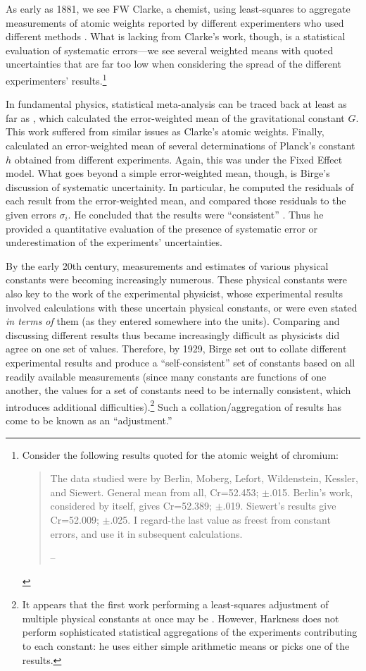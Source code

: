 \documentclass[letterpaper,12pt]{article}
\begin{document}
As early as 1881, we see FW Clarke, a chemist, using least-squares to aggregate measurements of atomic weights reported by different experimenters who used different methods \citep{clarke1881abstract}. What is lacking from Clarke's work, though, is a statistical evaluation of systematic errors---we see several weighted means with quoted uncertainties that are far too low when considering the spread of the different experimenters' results.\footnote{Consider the following results quoted for the atomic weight of chromium:
  \begin{quote}
    The data studied were by Berlin, Moberg, Lefort, Wildenstein, Kessler, and Siewert. General mean from all, Cr=52.453; $\pm$.015. Berlin's work, considered by itself, gives Cr=52.389; $\pm$.019. Siewert's results give Cr=52.009; $\pm$.025. I regard-the last value as freest from constant errors, and use it in subsequent calculations.
  
    \hfill-- \cite{clarke1881abstract}
  \end{quote}
}

In fundamental physics, statistical meta-analysis can be traced back at least as far as \cite{burgess1902value}, which calculated the error-weighted mean of the gravitational constant $G$. This work suffered from similar issues as Clarke's atomic weights. Finally, \cite{birge1919most} calculated an error-weighted mean of several determinations of Planck's constant $h$ obtained from different experiments. Again, this was under the Fixed Effect model. What goes beyond a simple error-weighted mean, though, is Birge's discussion of systematic uncertainity. In particular, he computed the residuals of each result from the error-weighted mean, and compared those residuals to the given errors $\sigma_i$. He concluded that the results were ``consistent'' \cite{birge1919most}. Thus he provided a quantitative evaluation of the presence of systematic error or underestimation of the experiments' uncertainties.

By the early 20th century, measurements and estimates of various physical constants were becoming increasingly numerous. These physical constants were also key to the work of the experimental physicist, whose experimental results involved calculations with these uncertain physical constants, or were even stated \emph{in terms of} them (as they entered somewhere into the units). Comparing and discussing different results thus became increasingly difficult as physicists did agree on one set of values. Therefore, by 1929, Birge set out to collate different experimental results and produce a ``self-consistent'' set of constants based on all readily available measurements (since many constants are functions of one another, the values for a set of constants need to be internally consistent, which introduces additional difficulties).\footnote{It appears that the first work performing a least-squares adjustment of multiple physical constants at once may be \cite{harkness1891solar}. However, Harkness does not perform sophisticated statistical aggregations of the experiments contributing to each constant: he uses either simple arithmetic means or picks one of the results.} Such a collation/aggregation of results has come to be known as an ``adjustment.''
\end{document}
